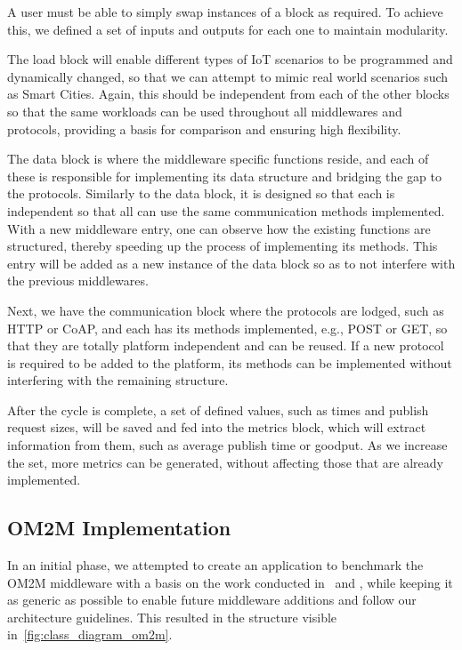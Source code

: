 \documentclass[conference]{IEEEtran}
\begin{document}
A user must be able to simply swap instances of a block as required. To achieve this, we defined a set of inputs and outputs for each one to maintain modularity. 

The load block will enable different types of IoT scenarios to be programmed and dynamically changed, so that we can attempt to mimic real world scenarios such as Smart Cities. Again, this should be independent from each of the other blocks so that the same workloads can be used throughout all middlewares and protocols, providing a basis for comparison and ensuring high flexibility. 
    
The data block is where the middleware specific functions reside, and each of these is responsible for implementing its data structure and bridging the gap to the protocols. Similarly to the data block, it is designed so that each is independent so that all can use the same communication methods implemented. With a new middleware entry, one can observe how the existing functions are structured, thereby speeding up the process of implementing its methods. This entry will be added as a new instance of the data block so as to not interfere with the previous middlewares.

Next, we have the communication block where the protocols are lodged, such as HTTP or CoAP, and each has its methods implemented, e.g., POST or GET, so that they are totally platform independent and can be reused. If a new protocol is required to be added to the platform, its methods can be implemented without interfering with the remaining structure.

After the cycle is complete, a set of defined values, such as times and publish request sizes, will be saved and fed into the metrics block, which will extract information from them, such as average publish time or goodput. As we increase the set, more metrics can be generated, without affecting those that are already implemented. 

\subsection{OM2M Implementation}

In an initial phase, we attempted to create an application to benchmark the OM2M middleware with a basis on the work conducted in~\cite{pereira_benchmarking_2018} and \cite{cardoso_benchmarking_2017}, while keeping it as generic as possible to enable future middleware additions and follow our architecture guidelines. This resulted in the structure visible in~\ref{fig:class_diagram_om2m}.
\end{document}
